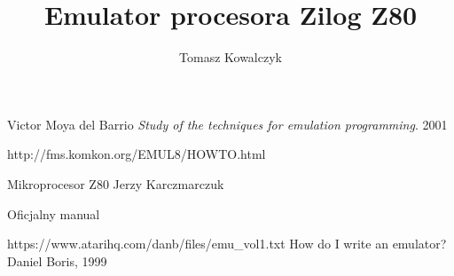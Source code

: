 \documentclass[12pt]{report}
\author{Tomasz Kowalczyk}
\title{Emulator procesora Zilog Z80}
\begin{document}
	\maketitle
	\tableofcontents
	
	
	
	
	
		
		
	
	
	
	
	
	
	
	\begin{thebibliography}{9}
		Victor Moya del Barrio
		\emph{Study of the techniques for emulation programming}.
		2001
		
		http://fms.komkon.org/EMUL8/HOWTO.html
		
		Mikroprocesor Z80 Jerzy Karczmarczuk
		
		Oficjalny manual
		
		 https://www.atarihq.com/danb/files/emu\_vol1.txt
		How do I write an emulator? Daniel Boris, 1999
	\end{thebibliography}
	
\end{document}
